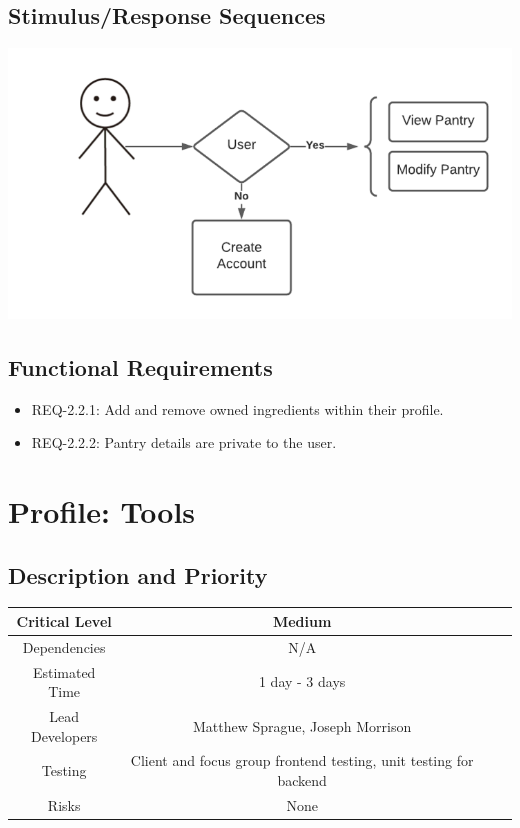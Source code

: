 \documentclass{scrreprt}
\begin{document}
\subsection{Stimulus/Response Sequences}

\includegraphics{FlowCharts/Profile-Pantry.png}

\subsection{Functional Requirements}

\begin{itemize}
    \item REQ-2.2.1: Add and remove owned ingredients within their profile.
    \item REQ-2.2.2: Pantry details are private to the user.
\end{itemize}

\section{Profile: Tools}

\subsection{Description and Priority}
\begin{center}
    \begin{tabular}{| c | c | c | c |}
        \hline
        Critical Level & Medium \\
        \hline
        Dependencies & N/A \\
        \hline
        Estimated Time & 1 day - 3 days \\
        \hline
        Lead Developers & Matthew Sprague, Joseph Morrison \\
        \hline
        Testing & Client and focus group frontend testing, unit testing for backend \\
        \hline
        Risks & None \\
        \hline
    \end{tabular}
\end{center}
\end{document}
